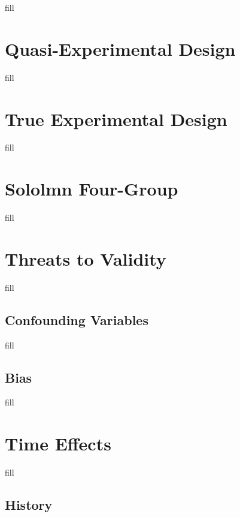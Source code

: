 \documentclass[
  b5paper]{book}
\begin{document}
fill

\hypertarget{quasi-experimental-design}{%
\section{Quasi-Experimental Design}\label{quasi-experimental-design}}

fill

\hypertarget{true-experimental-design}{%
\section{True Experimental Design}\label{true-experimental-design}}

fill

\hypertarget{sololmn-four-group}{%
\section{Sololmn Four-Group}\label{sololmn-four-group}}

fill

\hypertarget{threats-to-validity}{%
\section{Threats to Validity}\label{threats-to-validity}}

fill

\hypertarget{confounding-variables}{%
\subsection*{Confounding Variables}\label{confounding-variables}}

fill

\hypertarget{bias}{%
\subsection*{Bias}\label{bias}}

fill

\hypertarget{time-effects}{%
\section{Time Effects}\label{time-effects}}

fill

\hypertarget{history-1}{%
\subsection*{History}\label{history-1}}
\end{document}
